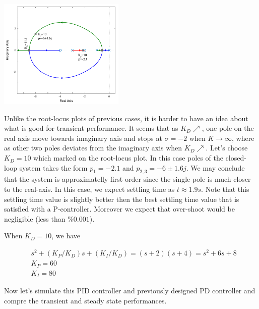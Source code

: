 \documentclass[twoside]{article}
\begin{document}
\vspace{12 pt}

  \begin{minipage}[h]{1\linewidth}
    \begin{center}
      \includegraphics[width=0.45\textwidth]{PIDlocus}
    \end{center}
  \end{minipage}

\vspace{12 pt}

Unlike the root-locus plots of previous cases, it is harder to
have an idea about what is good for transient performance.
It seems that as $K_D \nearrow$, one pole on the real axis 
move towards imaginary axis and stops at $\sigma = -2$ when
$K \to \infty$, where as other two poles deviates from the imaginary
axis when $K_D \nearrow$. Let's choose $K_D = 10$ which marked 
on the root-locus plot. In this case poles of the closed-loop system 
takes the form $p_1 = -2.1$ and $p_{2,3} = -6 \pm 1.6 j$. We 
may conclude that the system is approximatelly first order since
the single pole is much closer to the real-axis. In this case, we
expect settling time as $t \approx 1.9 s$. Note that this settling time
value is slightly better then the best settling time value that is
satisfied with a P-controller. Moreover we expect that over-shoot would
be negligible (less than $\% 0.001$).

When $K_D = 10$, we have 

\begin{align*}
&s^2 +   (K_P/K_D) s  + (K_I/K_D) = (s+2)(s+4) = s^2 + 6 s + 8
\\
&K_P = 60
\\
&K_I = 80
\end{align*}

Now let's simulate this PID controller and previously designed PD
controller and compre the transient and steady state performances.

\vspace{12 pt}
\end{document}
